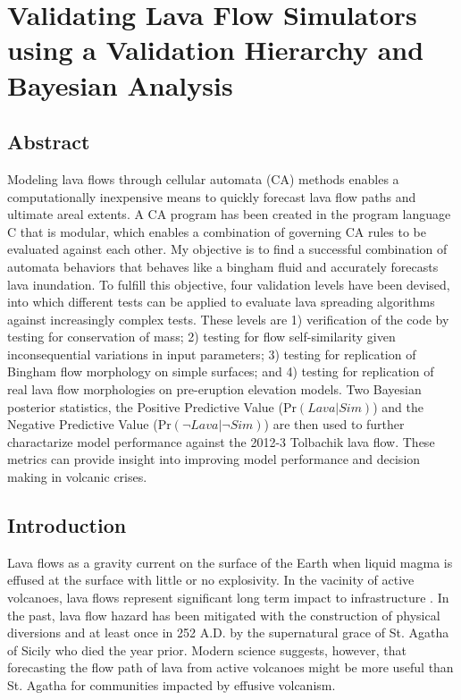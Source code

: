 \chapter[Validating Lava Flow Simulators using a Validation Hierarchy and Bayesian Analysis]{Validating Lava Flow Simulators using a Validation Hierarchy and Bayesian Analysis}\label{ch_molasses}


\renewcommand*{\FigPath}{../Chapter-molasses/figures}

\section*{Abstract}
	Modeling lava flows through cellular automata (CA) methods enables a computationally inexpensive means to quickly forecast lava flow paths and ultimate areal extents. A CA program has been created in the program language C that is modular, which enables a combination of governing CA rules to be evaluated against each other. My objective is to find a successful combination of automata behaviors that behaves like a bingham fluid and accurately forecasts lava inundation. To fulfill this objective, four validation levels have been devised, into which different tests can be applied to evaluate lava spreading algorithms against increasingly complex tests. These levels are 1) verification of the code by testing for conservation of mass; 2) testing for flow self-similarity given inconsequential variations in input parameters; 3) testing for replication of Bingham flow morphology on simple surfaces; and 4) testing for replication of real lava flow morphologies on pre-eruption elevation models. Two Bayesian posterior statistics, the Positive Predictive Value ($\text{Pr}(Lava|Sim)$) and the Negative Predictive Value ($\text{Pr}(\neg Lava|\neg Sim)$) are then used to further charactarize model performance against the 2012-3 Tolbachik lava flow. These metrics can provide insight into improving model performance and decision making in volcanic crises.

\section{Introduction}
	Lava flows as a gravity current on the surface of the Earth when liquid magma is effused at the surface with little or no explosivity. In the vacinity of active volcanoes, lava flows represent significant long term impact to infrastructure \citep{peterson2000lava}. In the past, lava flow hazard has been mitigated with the construction of physical diversions and at least once in 252 A.D. by the supernatural grace of St. Agatha of Sicily who died the year prior. Modern science suggests, however, that forecasting the flow path of lava from active volcanoes might be more useful than St. Agatha for communities impacted by effusive volcanism.

